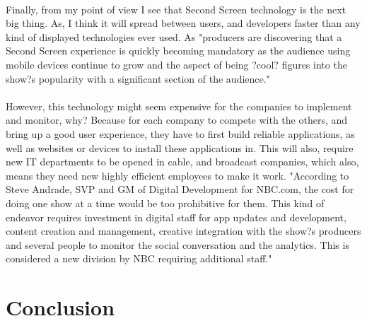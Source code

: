\documentclass[12pt, oneside]{article}   	%
\begin{document}
   \paragraph{}
Finally, from my point of view I see that Second Screen technology is the next big thing.  As, I think it will spread between users, and developers faster than any kind of displayed technologies ever used. As "producers are discovering that a Second Screen experience is quickly becoming mandatory as the audience using mobile devices continue to grow and the aspect of being ?cool? figures into the show?s popularity with a significant section of the audience."\cite{Second-Screen-Art}
   \paragraph{}
 However, this technology might seem expensive for the companies to implement and monitor, why?  Because for each company to compete with the others, and bring up a good user experience, they have to first build reliable applications, as well as websites or devices to install these applications in.  This will also, require new IT departments to be opened in cable, and broadcast companies, which also, means they need new highly efficient employees to make it work.  "According to Steve Andrade, SVP and GM of Digital Development for NBC.com, the cost for doing one show at a time would be too prohibitive for them. This kind of endeavor requires investment in digital staff for app updates and development, content creation and management, creative integration with the show?s producers and several people to monitor the social conversation and the analytics. This is considered a new division by NBC requiring additional staff." \cite{Second-Screen-Art}

 \section{Conclusion}
\end{document}
